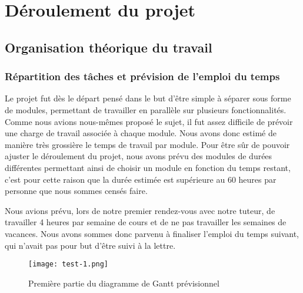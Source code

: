\graphicspath{{Others/}}

\section{Déroulement du projet}
\subsection{Organisation théorique du travail}
\subsubsection{Répartition des tâches et prévision de l'emploi du temps}
Le projet fut dès le départ pensé dans le but d'être simple à séparer sous forme de modules, permettant de travailler en parallèle sur plusieurs fonctionnalités.
Comme nous avions nous-mêmes proposé le sujet, il fut assez difficile de prévoir une charge de travail associée à chaque module. Nous avons donc estimé 
de manière très grossière le temps de travail par module. Pour être sûr de pouvoir ajuster le déroulement du projet, nous avons prévu des modules de durées différentes permettant ainsi
de choisir un module en fonction du temps restant, c'est pour cette raison que la durée estimée est supérieure au 60 heures par personne que nous sommes censés faire.
\par
Nous avions prévu, lors de notre premier rendez-vous avec notre tuteur, de travailler 4 heures par semaine de cours et de ne pas travailler les semaines de vacances.
Nous avons sommes donc parvenu à finaliser l'emploi du temps suivant, qui n'avait pas pour but d'être suivi à la lettre.
\vfill
\begin{figure}[!h]
    \begin{center}
        \texttt{[image: test-1.png]}
        \caption{Première partie du diagramme de Gantt prévisionnel}
    \end{center}
\end{figure}
